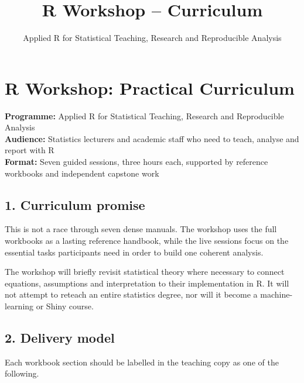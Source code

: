 \documentclass[11pt]{article}
\title{R Workshop -- Curriculum}
\author{Applied R for Statistical Teaching, Research and Reproducible Analysis}
\date{}
\begin{document}
\maketitle
\tableofcontents
\newpage
\hypertarget{r-workshop-practical-curriculum}{%
\section{R Workshop: Practical
Curriculum}\label{r-workshop-practical-curriculum}}

\textbf{Programme:} Applied R for Statistical Teaching, Research and
Reproducible Analysis\\
\textbf{Audience:} Statistics lecturers and academic staff who need to
teach, analyse and report with R\\
\textbf{Format:} Seven guided sessions, three hours each, supported by
reference workbooks and independent capstone work

\hypertarget{curriculum-promise}{%
\subsection{1. Curriculum promise}\label{curriculum-promise}}

This is not a race through seven dense manuals. The workshop uses the
full workbooks as a lasting reference handbook, while the live sessions
focus on the essential tasks participants need in order to build one
coherent analysis.

The workshop will briefly revisit statistical theory where necessary to
connect equations, assumptions and interpretation to their
implementation in R. It will not attempt to reteach an entire statistics
degree, nor will it become a machine-learning or Shiny course.

\hypertarget{delivery-model}{%
\subsection{2. Delivery model}\label{delivery-model}}

Each workbook section should be labelled in the teaching copy as one of
the following.
\end{document}
